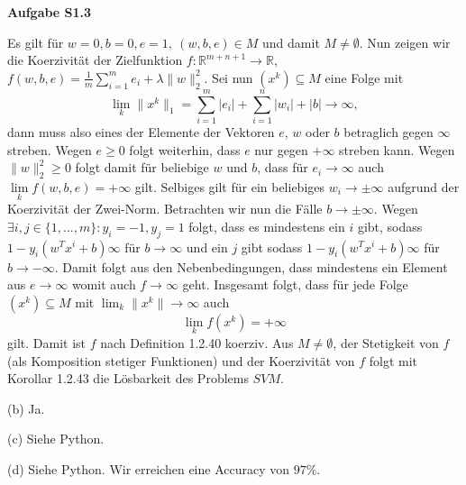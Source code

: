 \documentclass[ngerman, a4paper,12pt]{article}
\begin{document}
\textbf{Aufgabe S1.3} \par
Es gilt für $w=0, b=0, e=1, \ (w,b,e) \in M$ und damit $M\neq \emptyset$. Nun zeigen wir die Koerzivität der Zielfunktion $f: \mathbb{R}^{m+n+1} \rightarrow \mathbb{R}$, $f(w,b,e) = \frac{1}{m} \sum_{i=1}^{m}e_i + \lambda \|w \|_2^2$. Sei nun $(x^k) \subseteq M$ eine Folge mit 
\begin{equation}
	\lim\limits_{k} \| x^k \|_1 = \sum_{i=1}^{m}|e_i| + \sum_{i=1}^{n} |w_i| + |b|  \rightarrow \infty,
\end{equation}
dann muss also eines der Elemente der Vektoren $e$, $w$ oder $b$ betraglich gegen $\infty$ streben. Wegen $e \geq 0$ folgt weiterhin, dass $e$ nur gegen $+ \infty$ streben kann. Wegen $\| w \|_2^2 \geq 0$ folgt damit für beliebige $w$ und $b$, dass für $e_i \rightarrow \infty$ auch $\lim\limits_{k} f(w, b, e) = + \infty$ gilt. Selbiges gilt für ein beliebiges $w_i \rightarrow \pm \infty$ aufgrund der Koerzivität der Zwei-Norm. Betrachten wir nun die Fälle $b \rightarrow \pm \infty$. Wegen $\exists i,j \in \{1,...,m \} : y_i = -1, y_j = 1$ folgt, dass es mindestens ein $i$ gibt, sodass $1 - y_i (w^Tx^i + b) \infty$ für $b \rightarrow \infty$ und ein $j$ gibt sodass $1 - y_i (w^Tx^i + b) \infty$ für $b \rightarrow -\infty$. Damit folgt aus den Nebenbedingungen, dass mindestens ein Element aus $e \rightarrow \infty$ womit auch $f \rightarrow \infty$ geht. Insgesamt folgt, dass für jede Folge $(x^k) \subseteq M$ mit $\lim_k \| x^k \| \rightarrow \infty$ auch
\begin{equation*}
	\lim\limits_{k} f(x^k) = +\infty
\end{equation*}
gilt. Damit ist $f$ nach Definition 1.2.40 koerziv. Aus $M \neq \emptyset$, der Stetigkeit von $f$ (als Komposition stetiger Funktionen) und der Koerzivität von $f$ folgt mit Korollar 1.2.43 die Lösbarkeit des Problems $SVM$. \par
(b) Ja. \par
(c) Siehe Python. \par
(d) Siehe Python. Wir erreichen eine Accuracy von $97 \%$.
\end{document}
